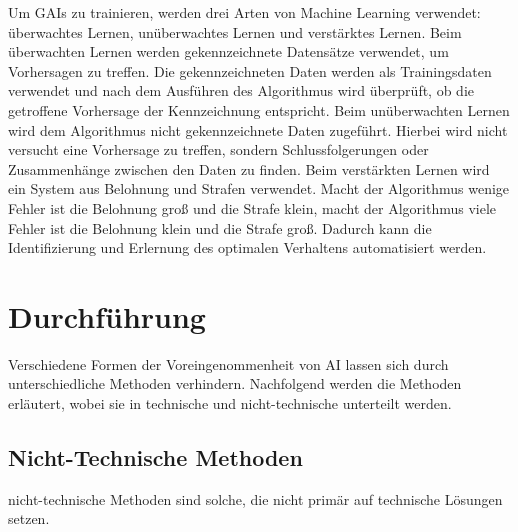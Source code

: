 \documentclass[12pt]{article}
\begin{document}
Um GAIs zu trainieren, werden drei Arten von Machine Learning verwendet: überwachtes Lernen, unüberwachtes Lernen und verstärktes Lernen. 
Beim überwachten Lernen werden gekennzeichnete Datensätze verwendet, um Vorhersagen zu treffen. Die gekennzeichneten Daten werden als Trainingsdaten verwendet und nach dem Ausführen des Algorithmus wird überprüft, ob die getroffene Vorhersage der Kennzeichnung entspricht.
Beim unüberwachten Lernen wird dem Algorithmus nicht gekennzeichnete Daten zugeführt. Hierbei wird nicht versucht eine Vorhersage zu treffen, sondern Schlussfolgerungen oder Zusammenhänge zwischen den Daten zu finden.
Beim verstärkten Lernen wird ein System aus Belohnung und Strafen verwendet. Macht der Algorithmus wenige Fehler ist die Belohnung groß und die Strafe klein, macht der Algorithmus viele Fehler ist die Belohnung klein und die Strafe groß. Dadurch kann die Identifizierung und Erlernung des 
optimalen Verhaltens automatisiert werden.

\chapter{Durchführung}
Verschiedene Formen der Voreingenommenheit von AI lassen sich durch unterschiedliche Methoden verhindern. Nachfolgend werden die Methoden erläutert, wobei sie in technische und nicht-technische unterteilt werden.

\section{Nicht-Technische Methoden}
nicht-technische Methoden sind solche, die nicht primär auf technische Lösungen setzen.
\end{document}
